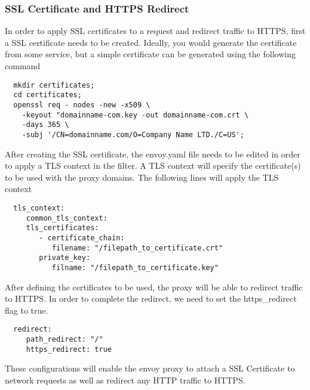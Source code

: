 \subsubsection{SSL Certificate and HTTPS Redirect}
In order to apply SSL certificates to a request and redirect traffic to HTTPS, first a SSL certificate needs to be created.
Ideally, you would generate the certificate from some service, but a simple certificate can be generated using the following command
\begin{verbatim}
  mkdir certificates;
  cd certificates;
  openssl req - nodes -new -x509 \
    -keyout "domainname-com.key -out domainname-com.crt \
    -days 365 \
    -subj '/CN=domainname.com/O=Company Name LTD./C=US';
\end{verbatim}
After creating the SSL certificate, the envoy.yaml file needs to be edited in order to apply a TLS context in the filter.
A TLS context will specify the certificate(s) to be used with the proxy domains. The following lines will apply the TLS context
\begin{verbatim}
  tls_context:
     common_tls_context:
     tls_certificates:
        - certificate_chain:
           filename: "/filepath_to_certificate.crt"
        private_key:
           filname: "/filepath_to_certificate.key"
\end{verbatim}
After defining the certificates to be used, the proxy will be able to redirect traffic to HTTPS. In order to complete the
redirect, we need to set the https_redirect flag to true.
\begin{verbatim}
  redirect:
     path_redirect: "/"
     https_redirect: true    
\end{verbatim}
These configurations will enable the envoy proxy to attach a SSL Certificate to network requests as well as redirect any
HTTP traffic to HTTPS.

